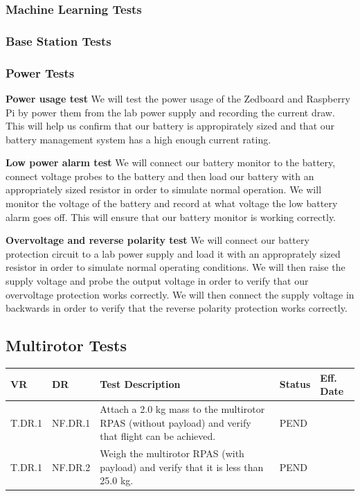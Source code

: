 \documentclass[10pt,letterpaper]{article}
\begin{document}
\subsubsection{Machine Learning Tests}
\subsubsection{Base Station Tests}
\subsubsection{Power Tests}

\textbf{Power usage test}
We will test the power usage of the Zedboard and Raspberry Pi by power them from the lab power supply and recording the current draw. This will help us confirm that our battery is appropirately sized and that our battery management system has a high enough current rating.

\textbf{Low power alarm test}
We will connect our battery monitor to the battery, connect voltage probes to the battery and then load our battery with an appropriately sized resistor in order to simulate normal operation. We will monitor the voltage of the battery and record at what voltage the low battery alarm goes off. This will ensure that our battery monitor is working correctly.

\textbf{Overvoltage and reverse polarity test}
We will connect our battery protection circuit to a lab power supply and load it with an approprately sized resistor in order to simulate normal operating conditions. We will then raise the supply voltage and probe the output voltage in order to verify that our overvoltage protection works correctly. We will then connect the supply voltage in backwards in order to verify that the reverse polarity protection works correctly.

\subsection{Multirotor Tests}
\begin{table}[H]
\begin{tabular}{ |p{1.1cm}|p{1.3cm}|p{9cm}|p{1.1cm}|p{1.7cm}|}
\hline
\textbf{VR}     & \textbf{DR}      & \textbf{Test Description}  	& \textbf{Status} & \textbf{Eff. Date} \\ \hline
T.DR.1 & NF.DR.1 & Attach a 2.0 kg mass to the multirotor RPAS (without payload) and verify that flight can be achieved. & PEND   & \\ \hline
T.DR.1 & NF.DR.2 & Weigh the multirotor RPAS (with payload) and verify that it is less than 25.0 kg. & PEND   & \\ \hline
\end{tabular}
\end{table}

\clearpage
{}



\end{document}
